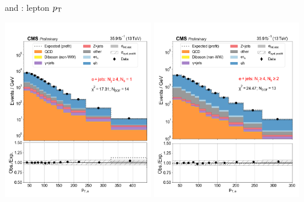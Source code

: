 \begin{frame}{}
\begin{columns}
        \begin{tcolorbox}[colframe=NUpurple]{ \ceh and \cmh: lepton $p_{\mathrm{T}}$}
            \begin{center}
                \includegraphics[width=0.48\textwidth]{chapters/Analysis/sectionStatisticalAnalysis/figures/fit/ejet_cat_gt4_eq1}
                \includegraphics[width=0.48\textwidth]{chapters/Analysis/sectionStatisticalAnalysis/figures/fit/ejet_cat_gt4_gt2}


\end{center}
\end{tcolorbox}
\end{columns}
\end{frame}
